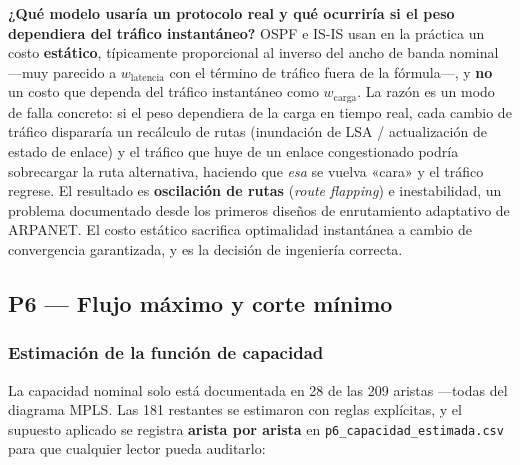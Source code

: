 \documentclass[10pt,a4paper]{extarticle}
\newcommand{\code}[1]{\texttt{\small #1}}
\begin{document}
\textbf{¿Qué modelo usaría un protocolo real y qué ocurriría si el peso dependiera del
tráfico instantáneo?} OSPF e IS-IS usan en la práctica un costo \textbf{estático},
típicamente proporcional al inverso del ancho de banda nominal ---muy parecido a
$w_{\text{latencia}}$ con el término de tráfico fuera de la fórmula---, y \textbf{no} un
costo que dependa del tráfico instantáneo como $w_{\text{carga}}$. La razón es un modo de
falla concreto: si el peso dependiera de la carga en tiempo real, cada cambio de tráfico
dispararía un recálculo de rutas (inundación de LSA / actualización de estado de enlace) y
el tráfico que huye de un enlace congestionado podría sobrecargar la ruta alternativa,
haciendo que \textit{esa} se vuelva «cara» y el tráfico regrese. El resultado es
\textbf{oscilación de rutas} (\textit{route flapping}) e inestabilidad, un problema
documentado desde los primeros diseños de enrutamiento adaptativo de ARPANET. El costo
estático sacrifica optimalidad instantánea a cambio de convergencia garantizada, y es la
decisión de ingeniería correcta.

\subsection{P6 --- Flujo máximo y corte mínimo}
\label{sec:p6}

\subsubsection{Estimación de la función de capacidad}
\label{sec:capacidad}

La capacidad nominal solo está documentada en 28 de las 209 aristas ---todas del diagrama
MPLS. Las 181 restantes se estimaron con reglas explícitas, y el supuesto aplicado se
registra \textbf{arista por arista} en \code{p6\_capacidad\_estimada.csv} para que cualquier
lector pueda auditarlo:
\end{document}
